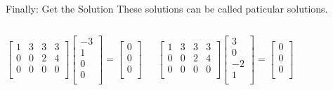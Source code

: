 \documentclass{beamer}
\begin{document}
\begin{frame}{Finally: Get the Solution}
These solutions can be called \alert{paticular solution}s.
\vspace{-5pt}
\begin{columns}
    \begin{equation*}
        \left[ \begin{matrix}
            1&		3&		3&		3\\
            0&		0&		2&		4\\
            0&		0&		0&		0\\
        \end{matrix} \right] \left[ \begin{array}{c}
            -3\\
            1\\
            0\\
            0\\
        \end{array} \right] =\left[ \begin{array}{c}
            0\\
            0\\
            0\\
        \end{array} \right]
    \end{equation*}

    \begin{equation*}
        \left[ \begin{matrix}
            1&		3&		3&		3\\
            0&		0&		2&		4\\
            0&		0&		0&		0\\
        \end{matrix} \right] \left[ \begin{array}{c}
            3\\
            0\\
            -2\\
            1\\
        \end{array} \right] =\left[ \begin{array}{c}
            0\\
            0\\
            0\\
        \end{array} \right]
    \end{equation*}
\end{columns}


\end{frame}
\end{document}
